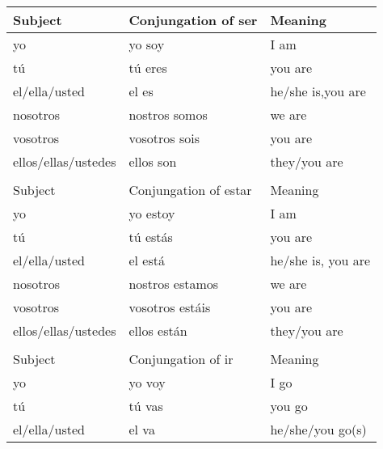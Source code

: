 \documentclass[a4paper,12pt]{article}
\begin{document}
\begin{table}[H]
\centering
\begin{tabular}{lll}
  Subject             & Conjungation of \textsf{ser}   & Meaning              \\
  \toprule
  yo                  & yo soy                         & I am                 \\
  tú                  & tú eres                        & you are              \\
  el/ella/usted       & el es                          & he/she is,you are    \\
  nosotros            & nostros somos                  & we are               \\
  vosotros            & vosotros sois                  & you are              \\
  ellos/ellas/ustedes & ellos son                      & they/you are         \\
  \midrule
                      &                                &                      \\
  Subject             & Conjungation of \textsf{estar} & Meaning              \\
  \toprule
  yo                  & yo estoy                       & I am                 \\
  tú                  & tú estás                       & you are              \\
  el/ella/usted       & el está                        & he/she is, you are   \\
  nosotros            & nostros estamos                & we are               \\
  vosotros            & vosotros estáis                & you are              \\
  ellos/ellas/ustedes & ellos están                    & they/you are         \\
  \midrule
                      &                                &                      \\
  Subject             & Conjungation of \textsf{ir}    & Meaning              \\
  \toprule
  yo                  & yo voy                         & I go                 \\
  tú                  & tú vas                         & you go               \\
  el/ella/usted       & el va                          & he/she/you go(s)     \\

\end{tabular}
\end{table}
\end{document}
